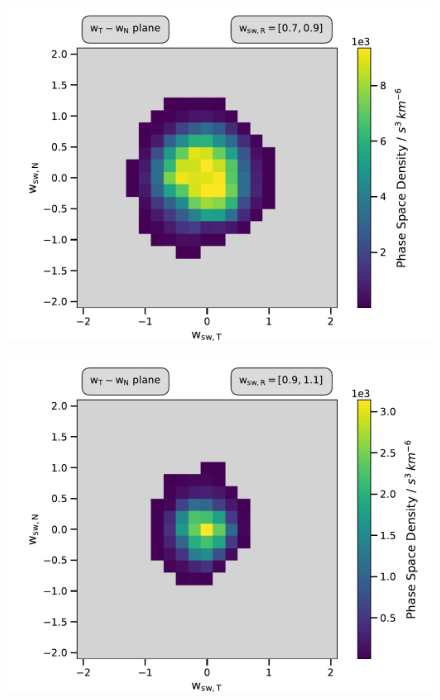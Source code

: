 \documentclass{beamer}
\begin{document}
\begin{frame}[plain]{}
\begin{figure}
	\includegraphics[scale=.6]{Pics/cart_50_step2.pdf}
\end{figure}
\end{frame}

\begin{frame}[plain]{}
\begin{figure}
	\includegraphics[scale=.6]{Pics/cart_50_step3.pdf}
\end{figure}
\end{frame}
\end{document}
